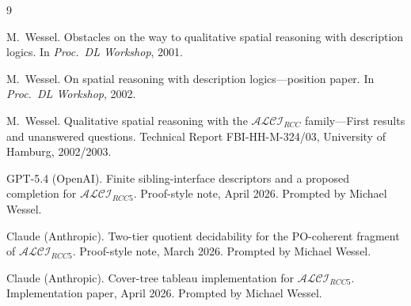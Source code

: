 \documentclass[11pt]{article}
\theoremstyle{definition}
\theoremstyle{remark}
\begin{document}
\begin{thebibliography}{9}

M.~Wessel.
\newblock Obstacles on the way to qualitative spatial reasoning with
  description logics.
\newblock In \emph{Proc.\ DL Workshop}, 2001.

M.~Wessel.
\newblock On spatial reasoning with description logics---position paper.
\newblock In \emph{Proc.\ DL Workshop}, 2002.

M.~Wessel.
\newblock Qualitative spatial reasoning with the
  {$\mathcal{ALCI}_\mathit{RCC}$} family---{F}irst results and
  unanswered questions.
\newblock Technical Report FBI-HH-M-324/03, University of Hamburg, 2002/2003.

GPT-5.4 (OpenAI).
\newblock Finite sibling-interface descriptors and a proposed completion
  for $\mathcal{ALCI}_{RCC5}$.
\newblock Proof-style note, April 2026.
\newblock Prompted by Michael Wessel.

Claude (Anthropic).
\newblock Two-tier quotient decidability for the PO-coherent fragment
  of $\mathcal{ALCI}_{RCC5}$.
\newblock Proof-style note, March 2026.
\newblock Prompted by Michael Wessel.

Claude (Anthropic).
\newblock Cover-tree tableau implementation for $\mathcal{ALCI}_{RCC5}$.
\newblock Implementation paper, April 2026.
\newblock Prompted by Michael Wessel.

\end{thebibliography}
\end{document}
